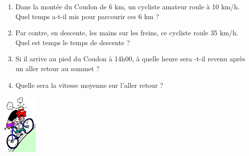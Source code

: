 
\begin{minipage}{0.89\linewidth}
\begin{enumerate}
\item Dans la montée du Coudon de 6 km, un cycliste amateur roule à 10 km/h. Quel temps a-t-il mis pour parcourir ces 6 km ?
\item Par contre, en descente, les mains sur les freins, ce cycliste roule 35 km/h. Quel est temps le temps de descente ?
\item Si il arrive au pied du Coudon à 14h00, à quelle heure sera -t-il revenu après un aller retour au sommet ?
\item Quelle sera la vitesse moyenne sur l'aller retour ?
\end{enumerate}
\end{minipage}
\begin{minipage}{0.09\linewidth}

\begin{flushright}
 \includegraphics[scale=1]{Prop-40.jpg}
 \end{flushright} 

\end{minipage}